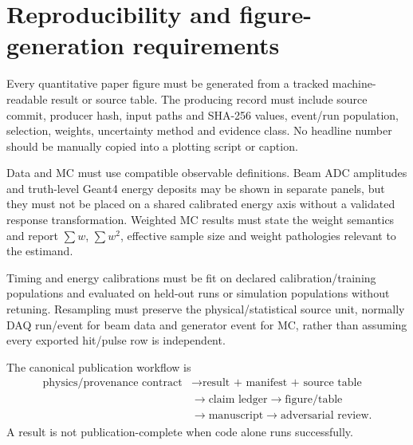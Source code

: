 \section{Reproducibility and figure-generation requirements}

Every quantitative paper figure must be generated from a tracked machine-readable result or source table. The producing record must include source commit, producer hash, input paths and SHA-256 values, event/run population, selection, weights, uncertainty method and evidence class. No headline number should be manually copied into a plotting script or caption.

Data and MC must use compatible observable definitions. Beam ADC amplitudes and truth-level Geant4 energy deposits may be shown in separate panels, but they must not be placed on a shared calibrated energy axis without a validated response transformation. Weighted MC results must state the weight semantics and report \(\sum w\), \(\sum w^2\), effective sample size and weight pathologies relevant to the estimand.

Timing and energy calibrations must be fit on declared calibration/training populations and evaluated on held-out runs or simulation populations without retuning. Resampling must preserve the physical/statistical source unit, normally DAQ run/event for beam data and generator event for MC, rather than assuming every exported hit/pulse row is independent.

The canonical publication workflow is
\[
\begin{aligned}
\text{physics/provenance contract} &\rightarrow \text{result + manifest + source table} \\
&\rightarrow \text{claim ledger} \rightarrow \text{figure/table} \\
&\rightarrow \text{manuscript} \rightarrow \text{adversarial review}.
\end{aligned}
\]
A result is not publication-complete when code alone runs successfully.

